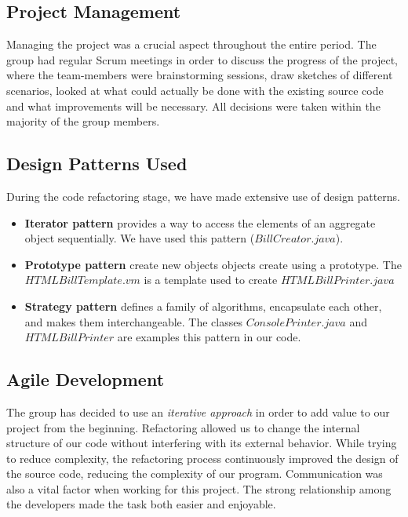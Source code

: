 \documentclass[11pt,twocolumn]{article} %
\begin{document}
\subsection{Project Management}
Managing the project was a crucial aspect throughout the entire period. The group had regular Scrum meetings in order to discuss the 
progress of the project, where the team-members were brainstorming sessions, draw sketches of different scenarios, looked at
what could actually be done with the existing source code and what improvements will be necessary. All decisions were taken
within the majority of the group members.

\subsection{Design Patterns Used}
During the code refactoring stage, we have made extensive use of design patterns.
\begin{itemize}
\item{{\bf Iterator pattern} provides a way to access the elements of an aggregate object sequentially. We have used this pattern ($BillCreator.java$).}
\item{{\bf Prototype pattern}  create new objects objects create using a prototype. The $HTMLBillTemplate.vm$ is a template used to create $HTMLBillPrinter.java$}
\item{{\bf Strategy pattern} defines a family of algorithms, encapsulate each other, and makes them interchangeable. The classes $ConsolePrinter.java$ and $HTMLBillPrinter$ are examples this pattern in our code.}
\end{itemize}


\subsection{Agile Development}
The group has decided to use an \emph{iterative approach} in order to add value to our project from the beginning. 
Refactoring allowed us to change the internal structure of our code without interfering with its external behavior. While trying to reduce complexity, 
the refactoring process continuously improved the design of the source code, reducing the complexity of our program.
Communication was also a vital factor when working for this project. The strong relationship among the developers made the task both 
easier and enjoyable.
\end{document}
